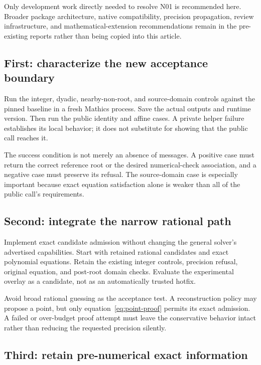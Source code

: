\documentclass[11pt,letterpaper]{article}
\begin{document}
Only development work directly needed to resolve N01 is recommended here. Broader package architecture, native compatibility, precision propagation, review infrastructure, and mathematical-extension recommendations remain in the pre-existing reports rather than being copied into this article.

\subsection{First: characterize the new acceptance boundary}

Run the integer, dyadic, nearby-non-root, and source-domain controls against the pinned baseline in a fresh Mathics process. Save the actual outputs and runtime version. Then run the public identity and affine cases. A private helper failure establishes its local behavior; it does not substitute for showing that the public call reaches it.

The success condition is not merely an absence of messages. A positive case must return the correct reference root or the desired numerical-check association, and a negative case must preserve its refusal. The source-domain case is especially important because exact equation satisfaction alone is weaker than all of the public call's requirements.

\subsection{Second: integrate the narrow rational path}

Implement exact candidate admission without changing the general solver's advertised capabilities. Start with retained rational candidates and exact polynomial equations. Retain the existing integer controls, precision refusal, original equation, and post-root domain checks. Evaluate the experimental overlay as a candidate, not as an automatically trusted hotfix.

Avoid broad rational guessing as the acceptance test. A reconstruction policy may propose a point, but only equation~\eqref{eq:point-proof} permits its exact admission. A failed or over-budget proof attempt must leave the conservative behavior intact rather than reducing the requested precision silently.

\subsection{Third: retain pre-numerical exact information}
\end{document}
